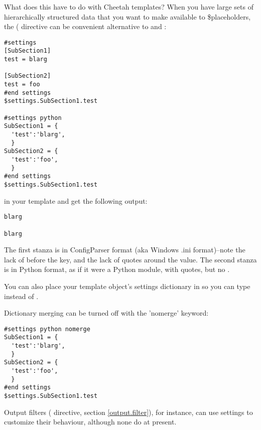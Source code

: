 What does this have to do with Cheetah templates? When you have large sets of
hierarchically structured data that you want to make available to
\$placeholders, the ( directive can be convenient
alternative to  and :

\begin{verbatim}
#settings
[SubSection1]
test = blarg

[SubSection2]
test = foo
#end settings
$settings.SubSection1.test

#settings python
SubSection1 = {
  'test':'blarg',
  }
SubSection2 = {
  'test':'foo',
  }
#end settings
$settings.SubSection1.test
\end{verbatim}

in your template and get the following output:

\begin{verbatim}
blarg

blarg
\end{verbatim}

The first stanza is in ConfigParser format (aka Windows .ini format)--note the
lack of \code{\$} before the key, and the lack of quotes around the value.  The
second stanza is in Python format, as if it were a Python module, with quotes,
but no \code{\$}.

You can also place your template object's settings dictionary in  so you can type  instead of
.

Dictionary merging can be turned off with the 'nomerge' keyword:

\begin{verbatim}
#settings python nomerge
SubSection1 = {
  'test':'blarg',
  }
SubSection2 = {
  'test':'foo',
  }
#end settings
$settings.SubSection1.test
\end{verbatim}

Output filters ( directive, section \ref{output.filter}),
for instance, can use settings to customize their behaviour, although none
do at present.

